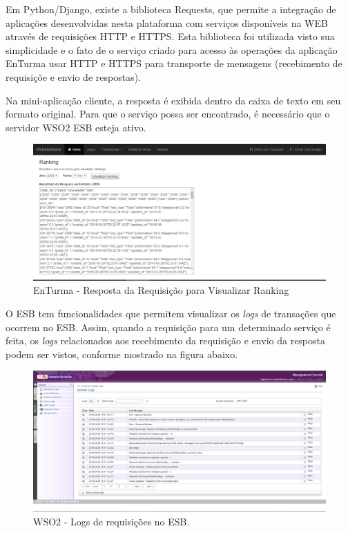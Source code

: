Em Python/Django, existe a biblioteca Requests, que permite a integração de aplicações desenvolvidas nesta plataforma com serviços disponíveis na WEB através de requisições HTTP e HTTPS. Esta biblioteca foi utilizada visto sua simplicidade e o fato de o serviço criado para acesso às operações da aplicação EnTurma usar HTTP e HTTPS para transporte de mensagens (recebimento de requisiçõe e envio de respostas).

Na mini-aplicação cliente, a resposta é exibida dentro da caixa de texto em seu formato original. Para que o serviço possa ser encontrado, é necessário que o servidor WSO2 ESB esteja ativo.

\newpage
\begin{figure}[htb]
\centering
\includegraphics[width=1.0\textwidth]{figuras/resultado_ranking_json.PNG}
\caption{EnTurma - Resposta da Requisição para Visualizar Ranking}
\label{resultado_ranking_json}
\end{figure}

O ESB tem funcionalidades que permitem visualizar os \textit{logs} de transações que ocorrem no ESB. Assim, quando a requisição para um determinado serviço é feita, os \textit{logs} relacionados aos recebimento da requisição e envio da resposta podem ser vistos, conforme mostrado na figura abaixo.

\begin{figure}[htb]
\centering
\includegraphics[width=1.0\textwidth]{figuras/losg_mediacao.PNG}
\caption{WSO2 - Logs de requisições no ESB.}
\label{losg_mediacao}
\end{figure}